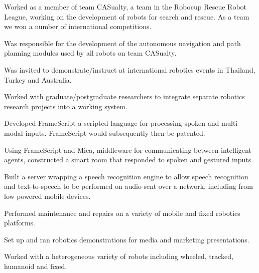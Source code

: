 \documentclass[a4paper]{awesome-deedy}
\begin{document}
\begin{minipage}[t]{0.66\textwidth}
\begin{tightemize}
\item Worked as a member of team CASualty, a team in the Robocup Rescue Robot League, working on the development of robots for search and rescue.  As a team we won a number of international competitions.
\item Was responsible for the development of the autonomous navigation and path planning modules used by all robots on team CASualty.
\item Was invited to demonstrate/instruct at international robotics events in Thailand, Turkey and Australia.
\item Worked with graduate/postgraduate researchers to integrate separate robotics research projects into a working system.
\item Developed FrameScript a scripted language for processing spoken and multi-modal inputs.  FrameScript would subsequently then be patented.
\item Using FrameScript and Mica, middleware for communicating between intelligent agents, constructed a smart room that responded to spoken and gestured inputs.
\item Built a server wrapping a speech recognition engine to allow speech recognition and text-to-speech to be performed on audio sent over a network, including from low powered mobile devices.
\item Performed maintenance and repairs on a variety of mobile and fixed robotics platforms.
\item Set up and ran robotics demonstrations for media and marketing presentations.
\item Worked with a heterogeneous variety of robots including wheeled, tracked, humanoid and fixed.
\end{tightemize}
\sectionsep


\end{minipage}
\end{document}
